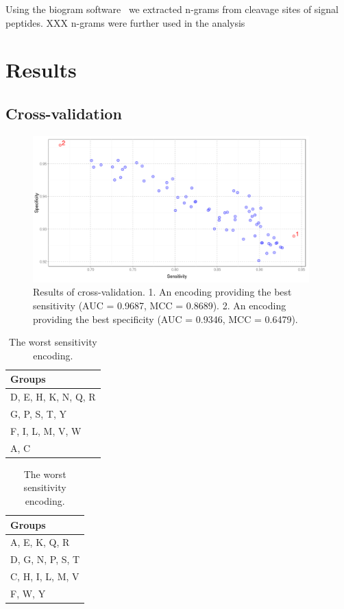 \documentclass[fleqn,10pt,twoside]{gcb15submission}
\begin{document}
Using the biogram software~\citep{biogramPackage} we extracted n-grams from cleavage sites of signal peptides. 
XXX n-grams were further used in the analysis

\section*{Results}

\subsection*{Cross-validation}

\begin{figure}[ht]\centering
\includegraphics[width=0.95\textwidth]{figures/cvres.png}
\caption{Results of cross-validation. 1. An encoding providing the best sensitivity (AUC = 0.9687, MCC = 0.8689). 2. An encoding providing the best specificity (AUC = 0.9346, MCC = 0.6479).}
\label{fig:cvres}
\end{figure}

\begin{table}[ht]
\begin{minipage}{.5\linewidth} 
\centering
\begin{tabular}{l}
  \toprule
Groups \\ 
  \midrule
D, E, H, K, N, Q, R \\ 
   \rowcolor[gray]{0.85}G, P, S, T, Y \\ 
  F, I, L, M, V, W \\ 
   \rowcolor[gray]{0.85}A, C \\ 
   \bottomrule
\end{tabular}
\caption{The best sensitivity (final) encoding.} 
\label{tab:best}
\end{minipage}
\begin{minipage}{.5\linewidth} 
\centering
\begin{tabular}{l}
  \toprule
Groups \\ 
  \midrule
A, E, K, Q, R \\ 
   \rowcolor[gray]{0.85}D, G, N, P, S, T \\ 
  C, H, I, L, M, V \\ 
   \rowcolor[gray]{0.85}F, W, Y \\ 
   \bottomrule
\end{tabular}
\caption{The worst sensitivity encoding.} 
\label{tab:worst}
\end{minipage}
\end{table}
\end{document}
